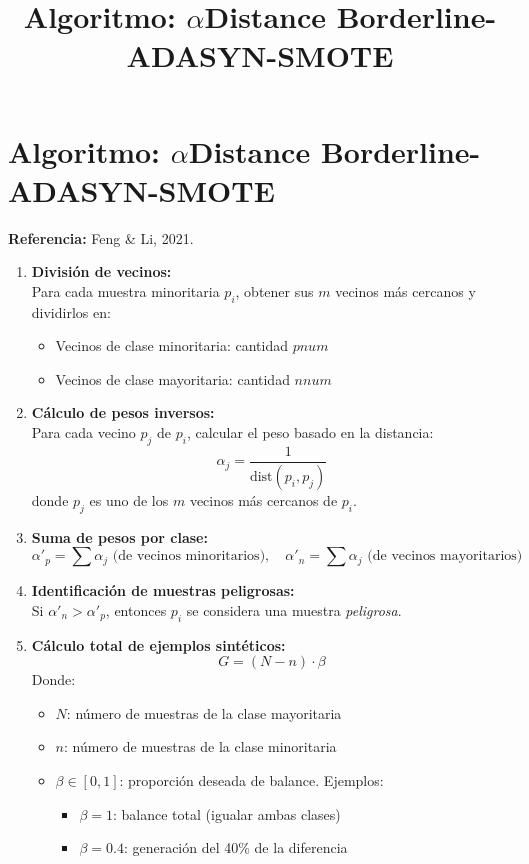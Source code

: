 \documentclass[12pt]{article}
\title{Algoritmo: $\alpha$Distance Borderline-ADASYN-SMOTE}
\date{}
\begin{document}
\maketitle

\section*{Algoritmo: $\alpha$Distance Borderline-ADASYN-SMOTE}

\textbf{Referencia:} Feng \& Li, 2021.

\begin{enumerate}[label=\textbf{\arabic*.}]
    \item \textbf{División de vecinos:}\\
    Para cada muestra minoritaria \( p_i \), obtener sus \( m \) vecinos más cercanos y dividirlos en:
    \begin{itemize}
        \item Vecinos de clase minoritaria: cantidad \( pnum \)
        \item Vecinos de clase mayoritaria: cantidad \( nnum \)
    \end{itemize}

    \item \textbf{Cálculo de pesos inversos:}\\
    Para cada vecino \( p_j \) de \( p_i \), calcular el peso basado en la distancia:
    \[
    \alpha_j = \frac{1}{\text{dist}(p_i, p_j)}
    \]
    donde \( p_j \) es uno de los \( m \) vecinos más cercanos de \( p_i \).

    \item \textbf{Suma de pesos por clase:}
    \[
    \alpha'_p = \sum \alpha_j \text{ (de vecinos minoritarios)}, \quad 
    \alpha'_n = \sum \alpha_j \text{ (de vecinos mayoritarios)}
    \]

    \item \textbf{Identificación de muestras peligrosas:}\\
    Si \( \alpha'_n > \alpha'_p \), entonces \( p_i \) se considera una muestra \emph{peligrosa}.

    \item \textbf{Cálculo total de ejemplos sintéticos:}
    \[
    G = (N - n) \cdot \beta
    \]
    Donde:
    \begin{itemize}
        \item \( N \): número de muestras de la clase mayoritaria
        \item \( n \): número de muestras de la clase minoritaria
        \item \( \beta \in [0,1] \): proporción deseada de balance. Ejemplos:
        \begin{itemize}
            \item \( \beta = 1 \): balance total (igualar ambas clases)
            \item \( \beta = 0.4 \): generación del 40\% de la diferencia
        \end{itemize}
    \end{itemize}


\end{enumerate}
\end{document}

